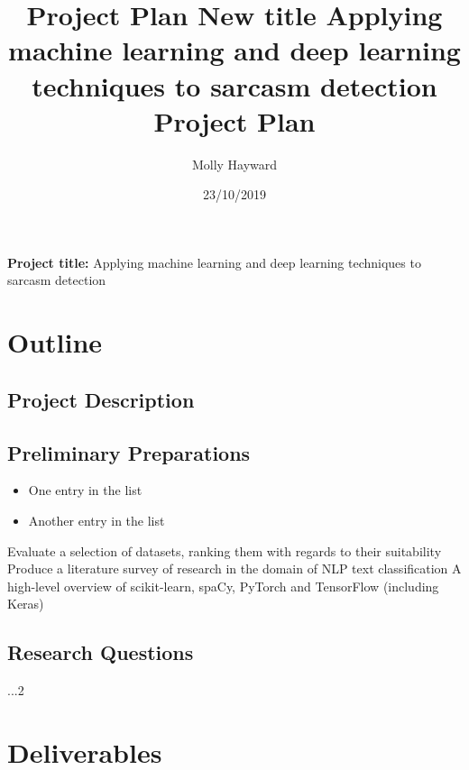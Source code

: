 \documentclass[12pt,a4paper]{article}
\title{Project Plan \large \newline 
New title}
\title{
	Applying machine learning and deep learning techniques to sarcasm detection \\
	\large Project Plan}
\author{Molly Hayward}
\date{23/10/2019}
\begin{document}
\maketitle

\begin{center}
	\textbf{Project title:} Applying machine learning and deep learning techniques to sarcasm detection
\end{center}


\section{Outline}
\subsection{Project Description}


\subsection{Preliminary Preparations}
\begin{itemize}
	\item One entry in the list
	\item Another entry in the list
\end{itemize}

Evaluate a selection of datasets, ranking them with regards to their suitability
Produce a literature survey of research in the domain of NLP text classification
A high-level overview of scikit-learn, spaCy, PyTorch and TensorFlow (including Keras)



\subsection{Research Questions}
...2


\newpage

\section{Deliverables}
\end{document}

